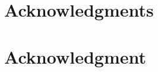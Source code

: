 \documentclass[10pt,journal,compsoc]{IEEEtran}
\begin{document}








%



\ifCLASSOPTIONcompsoc
  \section*{Acknowledgments}
\else
  \section*{Acknowledgment}
\fi
\end{document}
